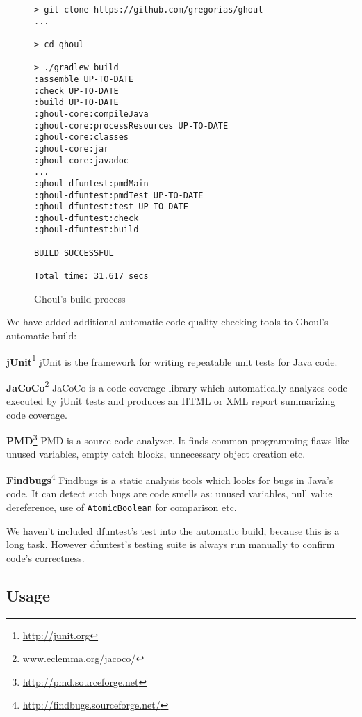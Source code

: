 \begin{figure}[tb]
\begin{verbatim}
> git clone https://github.com/gregorias/ghoul
...

> cd ghoul

> ./gradlew build
:assemble UP-TO-DATE
:check UP-TO-DATE
:build UP-TO-DATE
:ghoul-core:compileJava
:ghoul-core:processResources UP-TO-DATE
:ghoul-core:classes
:ghoul-core:jar
:ghoul-core:javadoc
...
:ghoul-dfuntest:pmdMain
:ghoul-dfuntest:pmdTest UP-TO-DATE
:ghoul-dfuntest:test UP-TO-DATE
:ghoul-dfuntest:check
:ghoul-dfuntest:build

BUILD SUCCESSFUL

Total time: 31.617 secs
\end{verbatim}
\caption{Ghoul's build process}
\label{fig:ghoul_build_process}
\end{figure}

We have added additional automatic code quality checking tools to Ghoul's automatic build:

\begin{description}
  \item{\textbf{jUnit}\footnote{\url{http://junit.org}}} 
    jUnit is the framework for writing repeatable unit tests for Java code.
  \item{\textbf{JaCoCo}\footnote{\url{www.eclemma.org/jacoco/}}}
    JaCoCo is a code coverage library which automatically analyzes code executed by jUnit tests and produces an HTML or XML report summarizing code coverage.

  \item{\textbf{PMD}\footnote{\url{http://pmd.sourceforge.net}}}
    PMD is a source code analyzer.
    It finds common programming flaws like unused variables, empty catch blocks, unnecessary object creation etc.
  \item{\textbf{Findbugs}\footnote{\url{http://findbugs.sourceforge.net/}}}
    Findbugs is a static analysis tools which looks for bugs in Java's code.
    It can detect such bugs are code smells as: unused variables, null value dereference, use of \texttt{AtomicBoolean} for comparison etc.
    
\end{description}

We haven't included dfuntest's test into the automatic build, because this is a long task.
However dfuntest's testing suite is always run manually to confirm code's correctness.

\subsection{Usage}

